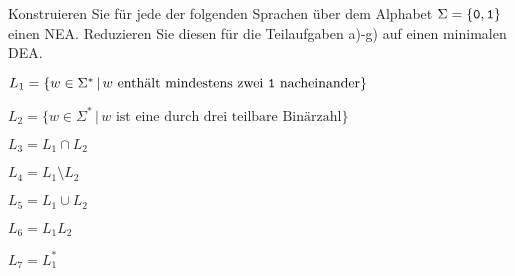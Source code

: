 Konstruieren Sie für jede der folgenden Sprachen über dem Alphabet
$\Sigma=\{{\tt 0},{\tt 1}\}$ einen NEA. Reduzieren Sie diesen für die
Teilaufgaben a)-g) auf einen minimalen DEA.
\begin{teilaufgaben}
\item $L_1=\{w\in\Sigma^*\,|\,\text{$w$ enthält mindestens zwei {\tt 1} nacheinander}\}$
\item $L_2=\{w\in\Sigma^*\,|\,\text{$w$ ist eine durch drei teilbare Binärzahl}\}$
\item $L_3=L_1\cap L_2$
\item $L_4=L_1\setminus L_2$
\item $L_5=L_1\cup L_2$
\item $L_6=L_1L_2$
\item $L_7=L_1^*$
\end{teilaufgaben}

